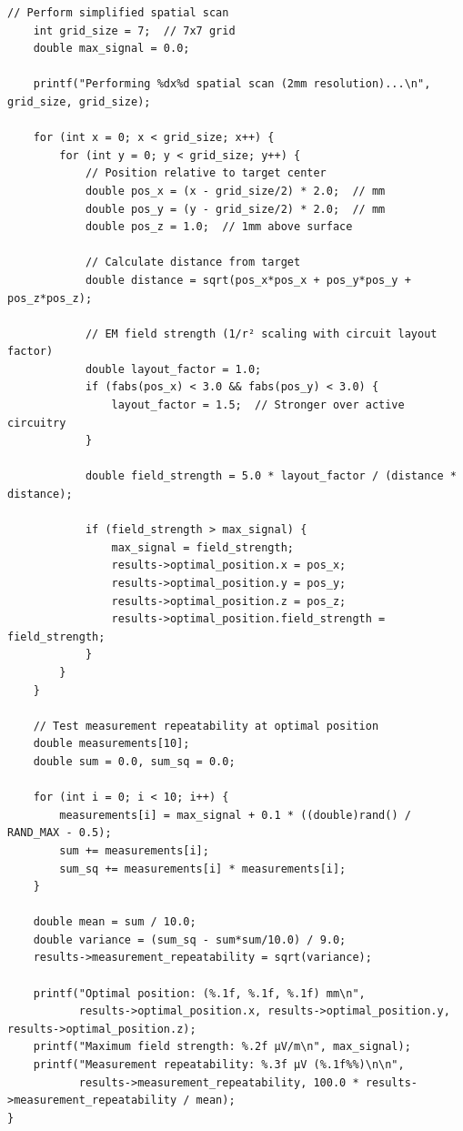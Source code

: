 \documentclass[11pt,a4paper]{article}
\theoremstyle{definition}
\begin{document}
\begin{lstlisting}[caption={Complete EM Calibration Implementation}]
    // Perform simplified spatial scan
    int grid_size = 7;  // 7x7 grid
    double max_signal = 0.0;
    
    printf("Performing %dx%d spatial scan (2mm resolution)...\n", grid_size, grid_size);
    
    for (int x = 0; x < grid_size; x++) {
        for (int y = 0; y < grid_size; y++) {
            // Position relative to target center
            double pos_x = (x - grid_size/2) * 2.0;  // mm
            double pos_y = (y - grid_size/2) * 2.0;  // mm
            double pos_z = 1.0;  // 1mm above surface
            
            // Calculate distance from target
            double distance = sqrt(pos_x*pos_x + pos_y*pos_y + pos_z*pos_z);
            
            // EM field strength (1/r² scaling with circuit layout factor)
            double layout_factor = 1.0;
            if (fabs(pos_x) < 3.0 && fabs(pos_y) < 3.0) {
                layout_factor = 1.5;  // Stronger over active circuitry
            }
            
            double field_strength = 5.0 * layout_factor / (distance * distance);
            
            if (field_strength > max_signal) {
                max_signal = field_strength;
                results->optimal_position.x = pos_x;
                results->optimal_position.y = pos_y;
                results->optimal_position.z = pos_z;
                results->optimal_position.field_strength = field_strength;
            }
        }
    }
    
    // Test measurement repeatability at optimal position
    double measurements[10];
    double sum = 0.0, sum_sq = 0.0;
    
    for (int i = 0; i < 10; i++) {
        measurements[i] = max_signal + 0.1 * ((double)rand() / RAND_MAX - 0.5);
        sum += measurements[i];
        sum_sq += measurements[i] * measurements[i];
    }
    
    double mean = sum / 10.0;
    double variance = (sum_sq - sum*sum/10.0) / 9.0;
    results->measurement_repeatability = sqrt(variance);
    
    printf("Optimal position: (%.1f, %.1f, %.1f) mm\n", 
           results->optimal_position.x, results->optimal_position.y, results->optimal_position.z);
    printf("Maximum field strength: %.2f μV/m\n", max_signal);
    printf("Measurement repeatability: %.3f μV (%.1f%%)\n\n", 
           results->measurement_repeatability, 100.0 * results->measurement_repeatability / mean);
}


\end{lstlisting}
\end{document}
